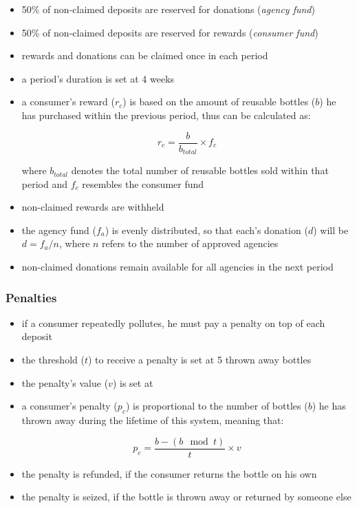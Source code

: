 \begin{itemize}
 	\item 50\% of non-claimed deposits are reserved for donations (\textit{agency fund})
  	\item 50\% of non-claimed deposits are reserved for rewards (\textit{consumer fund})
  	\item rewards and donations can be claimed once in each period
  	\item a period's duration is set at 4 weeks
  	\item a consumer's reward ($r_c$) is based on the amount of reusable bottles ($b$) he has purchased within the previous period, thus can be calculated as:

\begin{equation}
r_c = \frac{b}{b_{total}} \times f_c
\label{eq:rewardCalculation}
\end{equation}

where $b_{total}$ denotes the total number of reusable bottles sold within that period and $f_c$ resembles the consumer fund

	\item non-claimed rewards are withheld %
  	\item the agency fund ($f_a$) is evenly distributed, so that each's donation ($d$) will be $d = f_a/n$, where $n$ refers to the number of approved agencies
  	\item non-claimed donations remain available for all agencies in the next period
\end{itemize}

\subsubsection{Penalties}

\begin{itemize}
 	\item if a consumer repeatedly pollutes, he must pay a penalty on top of each deposit
	\item the threshold ($t$) to receive a penalty is set at 5 thrown away bottles
  	\item the penalty's value ($v$) is set at 
  	\item a consumer's penalty ($p_c$) is proportional to the number of bottles ($b$) he has thrown away during the lifetime of this system, meaning that: 

\begin{equation}
p_c = \frac{b - (b \mod t)}{t} \times v
\label{eq:penaltyCalculcation}
\end{equation}

  	\item the penalty is refunded, if the consumer returns the bottle on his own
  	\item the penalty is seized, if the bottle is thrown away or returned by someone else
\end{itemize}

